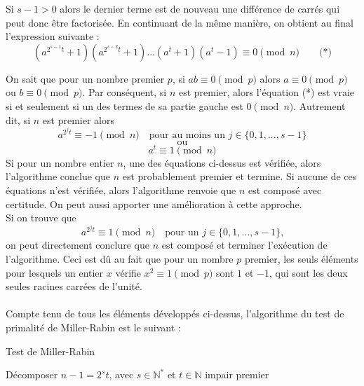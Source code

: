 		Si $s - 1 > 0$ alors le dernier terme est de nouveau une différence de carrés qui peut donc être factorisée. En continuant de la même manière, on obtient au final l'expression suivante :
		\[ (a^{2^{s-1}t} + 1)(a^{2^{s-2}t} + 1)...(a^{t} + 1)(a^{t} - 1) \equiv 0 \pmod n \quad\quad \text{(*)}\]
		
		On sait que pour un nombre premier $p$, si $ab \equiv 0 \pmod p$ alors $a \equiv 0 \pmod p$ ou $b \equiv 0 \pmod p$. Par conséquent, si $n$ est premier, alors l'équation (*) est vraie si et seulement si un des termes de sa partie gauche est $0 \pmod n$. Autrement dit, si $n$ est premier alors
		\[ a^{2^{j}t} \equiv -1 \pmod n \quad \text{pour au moins un } j \in \{0, 1, ..., s-1\} \]
		\[\text{ou}\]
		\[ a^{t} \equiv 1 \pmod n\]
		Si pour un nombre entier $n$, une des équations ci-dessus est vérifiée, alors l'algorithme conclue que $n$ est probablement premier et termine. Si aucune de ces équations n'est vérifiée, alors l'algorithme renvoie que $n$ est composé avec certitude. On peut aussi apporter une amélioration à cette approche.\\
		Si on trouve que
		\[ a^{2^{j}t} \equiv 1 \pmod n \quad \text{pour un } j \in \{0, 1, ..., s-1\} \text{,}\]
		on peut directement conclure que $n$ est composé et terminer l'exécution de l'algorithme. Ceci est dû au fait que pour un nombre $p$ premier, les seuls éléments pour lesquels un entier $x$ vérifie $x^{2} \equiv 1 \pmod p$ sont $1$ et $-1$, qui sont les deux seules racines carrées de l'unité.
		
		\paragraph{} Compte tenu de tous les éléments développés ci-dessus, l'algorithme du test de primalité de Miller-Rabin est le suivant :\\
		
		\begin{algorithm}[H]
			\caption{Test de Miller-Rabin}\label{TF}
			{Décomposer $n - 1 = 2^{s}t$, avec $s \in \mathbb{N}^{*}$ et $t \in \mathbb{N}$ impair \;}
			\Retour premier\;
		\end{algorithm}
	
